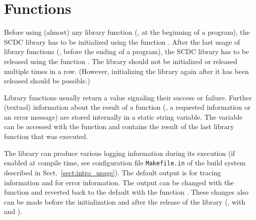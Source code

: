 \section{Functions}

Before using (almost) any library function (\eg, at the beginning of a program), the SCDC library has to be initialized using the function .
After the last usage of library functions (\eg, before the ending of a program), the SCDC library has to be released using the function .
The library should not be initialized or released multiple times in a row.
(However, initializing the library again after it has been released should be possible.)



Library functions usually return a value signaling their success or failure.
Further (textual) information about the result of a function (\eg, a requested information or an error message) are stored internally in a static string variable.
The variable can be accessed with the function  and contains the result of the last library function that was executed.


The library can produce various logging information during its execution (if enabled at compile time, see configuration file \texttt{Makefile.in} of the build system described in Sect.~\ref{sect:intro_usage}).
The default output is  for tracing information and  for error information.
The output can be changed with the function  and reverted back to the default with the function .
These changes also can be made before the initialization and after the release of the library (\ie, with  and ).

